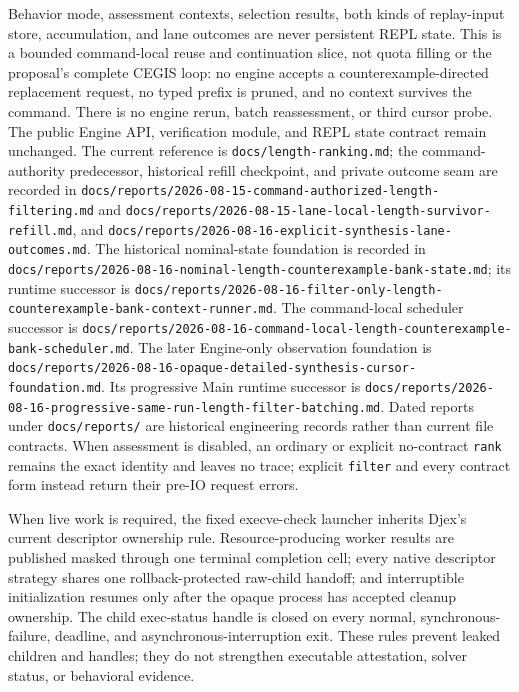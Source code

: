 \documentclass[11pt,oneside]{article}
\newcommand{\code}[1]{\texttt{#1}}
\begin{document}
Behavior mode, assessment contexts, selection results, both kinds of
replay-input store, accumulation, and lane outcomes are never persistent REPL
state. This is a bounded command-local reuse and continuation slice, not quota
filling or the proposal's complete CEGIS loop: no engine accepts a
counterexample-directed replacement request, no typed prefix is pruned, and no
context survives the command. There is no engine rerun, batch reassessment, or
third cursor probe. The public Engine API, verification module, and REPL state
contract remain unchanged. The current reference
is \code{docs/length-ranking.md}; the command-authority predecessor, historical
refill checkpoint, and private outcome seam are recorded in
\code{docs/reports/2026-08-15-command-authorized-length-filtering.md} and
\code{docs/reports/2026-08-15-lane-local-length-survivor-refill.md}, and
\code{docs/reports/2026-08-16-explicit-synthesis-lane-outcomes.md}. The
historical nominal-state foundation is recorded in
\code{docs/reports/2026-08-16-nominal-length-counterexample-bank-state.md}; its
runtime successor is
\code{docs/reports/2026-08-16-filter-only-length-counterexample-bank-context-runner.md}.
The command-local scheduler successor is
\code{docs/reports/2026-08-16-command-local-length-counterexample-bank-scheduler.md}.
The later Engine-only observation foundation is
\code{docs/reports/2026-08-16-opaque-detailed-synthesis-cursor-foundation.md}.
Its progressive Main runtime successor is
\code{docs/reports/2026-08-16-progressive-same-run-length-filter-batching.md}.
Dated
reports under \code{docs/reports/} are historical engineering records rather
than current file contracts. When assessment is disabled, an ordinary or
explicit no-contract \code{rank} remains the exact identity and leaves no
trace; explicit \code{filter} and every contract form instead return their
pre-IO request errors.

When live work is required, the fixed execve-check launcher inherits Djex's
current descriptor ownership rule. Resource-producing worker results are
published masked through one terminal completion cell; every native descriptor
strategy shares one rollback-protected raw-child handoff; and interruptible
initialization resumes only after the opaque process has accepted cleanup
ownership. The child exec-status handle is closed on every normal,
synchronous-failure, deadline, and asynchronous-interruption exit. These rules
prevent leaked children and handles; they do not strengthen executable
attestation, solver status, or behavioral evidence.
\end{document}
